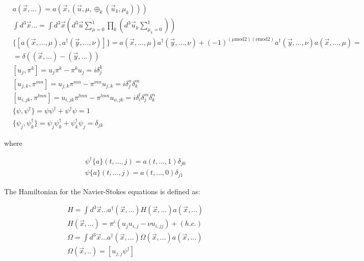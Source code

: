 \documentclass[11pt]{book}
\begin{document}
\begin{equation}\begin{aligned}
    & a(\vec{x}, ...) = a(\vec{x},(\vec{u},\mu,\oplus_{k}(\vec{u}_{k},\mu_{k})))\\
    & \int d^3\vec{x} ... = \int d^3\vec{x}(d^3\vec{u}\sum_{\mu=0}^1\prod_{k}(d^3 \vec{u}_{k}\sum_{\mu_{k}=0}^1)) \\
 &\{[a(\vec{x}, ..., \mu),a^\dagger(\vec{y}, ...,\nu)]\}=a(\vec{x}, ...,\mu) a^\dagger(\vec{y}, ...,\nu)+(-1)^{(\mu \mathrm{mod} 2)(\nu \mathrm{mod} 2)}a^\dagger(\vec{y}, ...,\nu) a(\vec{x}, ...,\mu)=\\
&=\delta((\vec{x},...)-(\vec{y},...))\\
    &[u_{j},\pi^{k}]=u_{j}\pi^{k}-\pi^{k} u_{j}= i\delta^{k}_{j}\\
    &[ u_{j,k},\pi^{m n}]=u_{j,k}\pi^{m n}-\pi^{m n} u_{j,k}= i\delta^{n}_{j}\delta^{m}_{k}\\
   &[ u_{i,j k},\pi^{l m n}]=u_{i, j k}\pi^{l m n}-\pi^{l m n} u_{o, j k}= i\delta^{l}_{i} \delta^{m}_{j}\delta^{n}_{k}\\
 &\{\psi,\psi^\dagger\}=\psi \psi^\dagger+\psi^\dagger\psi=1\\
&\{\psi_{j},\psi^\dagger_{k}\}=\psi_{j} \psi^\dagger_{k}+\psi^\dagger_{k}\psi_{j}=\delta_{j k}
\end{aligned}\end{equation}

where

\begin{equation}\begin{aligned}
 & \psi^\dagger\{a\}(t, ...,j)= a(t, ...,1) \delta_{j 0}\\
& \psi\{a\}(t, ...,j)=  a(t, ...,0) \delta_{j 1}
\end{aligned}\end{equation}

The Hamiltonian for the Navier-Stokes equations is defined as:

\begin{equation}\begin{aligned}
    &H=\int d^3\vec{x} ... a^\dagger(\vec{x}, ...)H(\vec{x}, ...)  a(\vec{x}, ...)\\
&H(\vec{x}, ...)=\pi^i (u_j u_{i,j}-\nu u_{i,j j})+(h.c.)\\
    &\Omega=\int d^3\vec{x} ...  a^\dagger(\vec{x}, ...) \Omega(\vec{x},...) a(\vec{x}, ...)\\
    &\Omega(\vec{x},..)=\left[ u_{j,j} \psi^\dagger\right]
\end{aligned}\end{equation}
\end{document}
